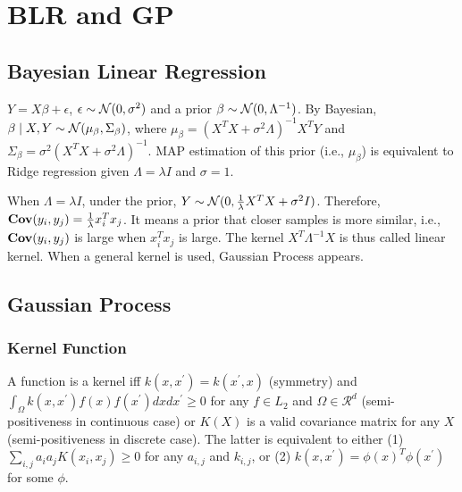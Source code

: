 \section{BLR and GP}

\subsection*{Bayesian Linear Regression}

$Y=X\beta+\epsilon$, $\epsilon\sim \mathcal{N}(0, \sigma^2)$ and a prior $\beta \sim \mathcal{N}(0, \Lambda^{-1})$. By Bayesian, $\beta \mid X, Y \sim \mathcal{N}(\mu_\beta, \Sigma_\beta)$, where $\mu_\beta = (X^T X+\sigma^2\Lambda)^{-1}X^T Y$ and $\Sigma_\beta = \sigma^2 (X^T X+\sigma^2 \Lambda)^{-1}$. MAP estimation of this prior (i.e., $\mu_\beta$) is equivalent to Ridge regression given $\Lambda = \lambda I$ and $\sigma=1$.

When $\Lambda=\lambda I$, under the prior, $Y\sim \mathcal{N}(0, \frac{1}{\lambda}X^T X+\sigma^2 I)$. Therefore, $\operatorname{\textbf{Cov}}(y_i, y_j) = \frac{1}{\lambda}x_i^T x_j$. It means a prior that closer samples is more similar, i.e., $\operatorname{\textbf{Cov}}(y_i, y_j)$ is large when $x_i^T x_j$ is large. The kernel $X^T \Lambda^{-1} X$ is thus called linear kernel. When a general kernel is used, Gaussian Process appears.

\subsection*{Gaussian Process}

\subsubsection*{Kernel Function}
A function is a kernel iff $k(x, x^\prime)=k(x^\prime, x)$ (symmetry) and $\int_\Omega k(x, x^\prime) f(x) f(x^\prime) dx dx^\prime \ge 0$ for any $f \in L_2$ and $\Omega \in \mathcal{R}^d$ (semi-positiveness in continuous case) or $K(X)$ is a valid covariance matrix for any $X$ (semi-positiveness in discrete case). The latter is equivalent to either (1) $\sum_{i,j} a_i a_j K(x_i, x_j) \ge 0$ for any $a_{i,j}$ and $k_{i,j}$, or (2) $k(x, x^\prime) = \phi(x)^T \phi(x^\prime)$ for some $\phi$.

